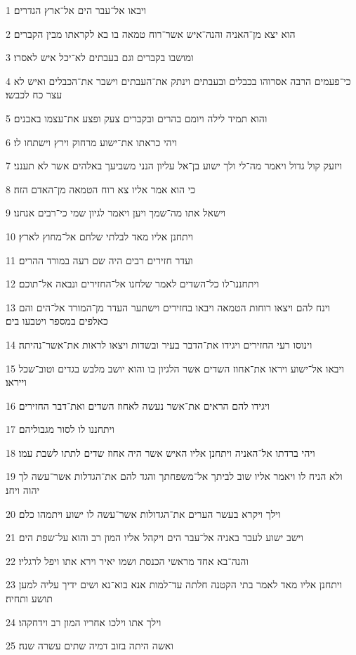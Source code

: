 \par 1 ויבאו אל־עבר הים אל־ארץ הגדרים׃
\par 2 הוא יצא מן־האניה והנה־איש אשר־רוח טמאה בו בא לקראתו מבין הקברים׃
\par 3 ומושבו בקברים וגם בעבתים לא־יכל איש לאסרו׃
\par 4 כי־פעמים הרבה אסרוהו בכבלים ובעבתים וינתק את־העבתים וישבר את־הכבלים ואיש לא עצר כח לכבשו׃
\par 5 והוא תמיד לילה ויומם בהרים ובקברים צעק ופצע את־עצמו באבנים׃
\par 6 ויהי כראתו את־ישוע מרחוק וירץ וישתחו לו׃
\par 7 ויזעק קול גדול ויאמר מה־לי ולך ישוע בן־אל עליון הנני משביעך באלהים אשר לא תענני׃
\par 8 כי הוא אמר אליו צא רוח הטמאה מן־האדם הזה׃
\par 9 וישאל אתו מה־שמך ויען ויאמר לגיון שמי כי־רבים אנחנו׃
\par 10 ויתחנן אליו מאד לבלתי שלחם אל־מחוץ לארץ׃
\par 11 ועדר חזירים רבים היה שם רעה במורד ההרים׃
\par 12 ויתחננו־לו כל־השדים לאמר שלחנו אל־החזירים ונבאה אל־תוכם׃
\par 13 וינח להם ויצאו רוחות הטמאה ויבאו בחזירים וישתער העדר מן־המורד אל־הים והם כאלפים במספר ויטבעו בים׃
\par 14 וינוסו רעי החזירים ויגידו את־הדבר בעיר ובשדות ויצאו לראות את־אשר־נהיתה׃
\par 15 ויבאו אל־ישוע ויראו את־אחוז השדים אשר הלגיון בו והוא יושב מלבש בגדים וטוב־שכל וייראו׃
\par 16 ויגידו להם הראים את־אשר נעשה לאחוז השדים ואת־דבר החזירים׃
\par 17 ויתחננו לו לסור מגבוליהם׃
\par 18 ויהי ברדתו אל־האניה ויתחנן אליו האיש אשר היה אחוז שדים לתתו לשבת עמו׃
\par 19 ולא הניח לו ויאמר אליו שוב לביתך אל־משפחתך והגד להם את־הגדלות אשר־עשה לך יהוה ויחנ׃
\par 20 וילך ויקרא בעשר הערים את־הגדולות אשר־עשה לו ישוע ויתמהו כלם׃
\par 21 וישב ישוע לעבר באניה אל־עבר הים ויקהל אליו המון רב והוא על־שפת הים׃
\par 22 והנה־בא אחד מראשי הכנסת ושמו יאיר וירא אתו ויפל לרגליו׃
\par 23 ויתחנן אליו מאד לאמר בתי הקטנה חלתה עד־למות אנא בוא־נא ושים ידיך עליה למען תושע ותחיה׃
\par 24 וילך אתו וילכו אחריו המון רב וידחקהו׃
\par 25 ואשה היתה בזוב דמיה שתים עשרה שנה׃
